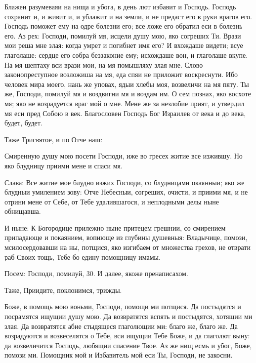 

Блажен разумеваяи на нища и убога, в день лют избавит и Господь. Господь сохранит и, и живит и, и ублажит и на земли, и не предаст его в руки врагов его. Господь поможет ему на одре болезни его; все ложе его обратил еси в болезнь его. Аз рех: Господи, помилуй мя, исцели душу мою, яко согреших Ти. Врази мои реша мне злая: когда умрет и погибнет имя его? И вхождаше видети; всуе глаголаше: сердце его собра беззаконие ему; исхождаше вон, и глаголаше вкупе. На мя шептаху вси врази мои, на мя помышляху злая мне. Слово законопреступное возложиша на мя, еда спяи не приложит воскреснути. Ибо человек мира моего, нань же уповах, ядыи хлебы моя, возвеличи на мя пяту. Ты же, Господи, помилуй мя и воздвигни мя и воздам им. О сем познах, яко восхоте мя; яко не возрадуется враг мой о мне. Мене же за незлобие прият, и утвердил мя еси пред Собою в век. Благословен Господь Бог Израилев от века и до века, будет, будет.

Таже Трисвятое, и по Отче наш:




Смиренную душу мою посети Господи, иже во гресех  житие все изжившу. Но яко  блудницу приими мене и спаси мя.

Слава: Все житие мое блудно изжих Господи, со блудницами окаянныи; яко же блудныи умилением зову: Отче Небесныи, согреших, очисти, и приими мя, и не отрини мене от Себе, от Тебе удалившагося, и неплодными делы ныне обнищавша.

И ныне: К Богородице прилежно ныне притецем грешнии, со смирением припадающе и покаянием, вопиюще из глубины душевныя: Владычице, помози, мсилосердовавши на ны, потщися, яко изгибаем от множества грехов, не отврати раб Своих тощь, Тебе бо едину помощницу имамы.


Посем: Господи, помилуй, 30. И далее, якоже пренаписахом.


Таже, Приидите, поклонимся, трижды.




Боже, в помощь мою воньми, Господи, помощи ми потщися. Да постыдятся и посрамятся ищущии душу мою. Да возвратятся вспять и постыдятся, хотящии ми злая. Да возвратятся абие стыдящеся глаголющии ми: благо же, благо же. Да возрадуются и возвеселятся о Тебе, вси ищущии Тебе Боже, и да глаголют выну: да возвеличится Господь, любящии спасение Твое. Аз же нищ есмь и убог, Боже, помози ми. Помощник мой и Избавитель мой еси Ты, Господи, не закосни.


